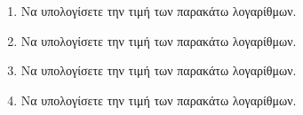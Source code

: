 \documentclass[twoside,nofonts,internet]{askhseis}
\begin{document}
\begin{enumerate}
\item Να υπολογίσετε την τιμή των παρακάτω λογαρίθμων.
\begin{multicols}{3}
\end{multicols}
\item Να υπολογίσετε την τιμή των παρακάτω λογαρίθμων.
\begin{multicols}{3}
\end{multicols}
\item Να υπολογίσετε την τιμή των παρακάτω λογαρίθμων.
\begin{multicols}{3}
\end{multicols}
\item Να υπολογίσετε την τιμή των παρακάτω λογαρίθμων.
\begin{multicols}{3}
\end{multicols}
\end{enumerate}
\end{document}
